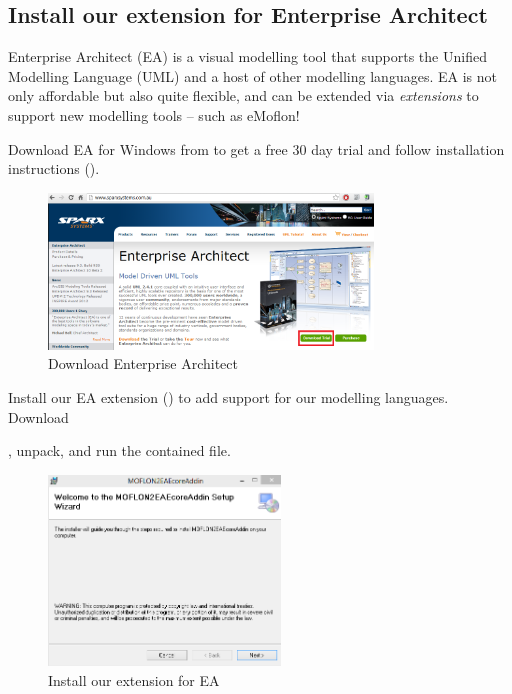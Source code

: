 \newpage

\genHeader
\subsection{Install our extension for Enterprise Architect}

Enterprise Architect (EA) is a visual modelling tool that supports the Unified Modelling Language (UML) and a host of other modelling languages.
EA is not only affordable but also quite flexible, and can be extended via \emph{extensions} to support new modelling tools -- such as eMoflon!

\begin{stepbystep}
\item Download\hypertarget{installEA vis}{} EA for Windows from  to get a free 30 day trial and follow
installation instructions ().

\begin{figure}[htbp]
	\centering
  	\includegraphics[width=0.77\textwidth]{../../org.moflon.doc.handbook.01_installation/1_installation/installEA/iea_images/ea_download}
	\caption{Download Enterprise Architect}
	\label{enterpriseArchitextHomepage}
\end{figure} 

\item Install our EA extension () to add support for our modelling languages.
Download 

{\footnotesize \eMoflonEAAddin}

, unpack, and run the contained  file.

\begin{figure}[htbp]
	\centering
  \includegraphics[width=0.55\textwidth]{../../org.moflon.doc.handbook.01_installation/1_installation/installEA/iea_images/eaplugin_install}
	\caption{Install our extension for EA}
	\label{eaPluginWizard}
\end{figure}
\end{stepbystep}